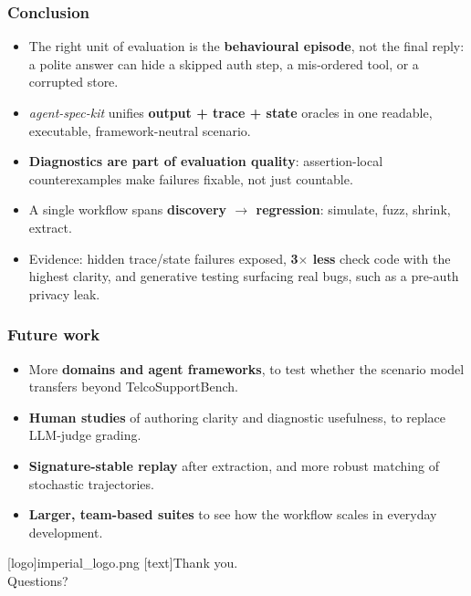 \documentclass[
	aspectratio=169, %
	t,               %
	onlytextwidth,
	10pt,
]{beamer}
\begin{document}
\begin{frame}
	\frametitle{Conclusion}
	\begin{itemize}
		\setlength\itemsep{0.7em}
		\item The right unit of evaluation is the \textbf{behavioural episode}, not the final reply:
		a polite answer can hide a skipped auth step, a mis-ordered tool, or a corrupted store.
		\item \emph{agent-spec-kit} unifies \textbf{output + trace + state} oracles in one readable,
		executable, framework-neutral scenario.
		\item \textbf{Diagnostics are part of evaluation quality}: assertion-local counterexamples make
		failures fixable, not just countable.
		\item A single workflow spans \textbf{discovery $\rightarrow$ regression}: simulate, fuzz, shrink, extract.
		\item Evidence: hidden trace/state failures exposed, \textbf{3$\times$ less} check code with the
		highest clarity, and generative testing surfacing real bugs, such as a pre-auth privacy leak.
	\end{itemize}
\end{frame}

\begin{frame}
	\frametitle{Future work}
	\begin{itemize}
		\setlength\itemsep{0.8em}
		\item More \textbf{domains and agent frameworks}, to test whether the scenario model transfers
		beyond TelcoSupportBench.
		\item \textbf{Human studies} of authoring clarity and diagnostic usefulness, to replace LLM-judge grading.
		\item \textbf{Signature-stable replay} after extraction, and more robust matching of stochastic
		trajectories.
		\item \textbf{Larger, team-based suites} to see how the workflow scales in everyday development.
	\end{itemize}
\end{frame}

\begingroup
	[logo]{imperial_logo.png}
	[text]{Thank you.\\ Questions?}
\endgroup
\end{document}
